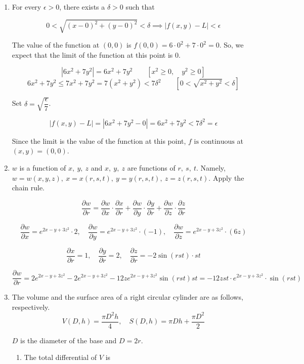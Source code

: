 \documentclass[a4paper, 12pt]{article}
\begin{document}
\begin{enumerate}[leftmargin=*,label=\textbf{\arabic*.}]
\newpage

\item For every $\epsilon>0$, there exists a $\delta>0$ such that

\[0<\sqrt{(x-0)^2+(y-0)^2}<\delta\implies\left|f(x,y)-L\right|<\epsilon\]

The value of the function at $(0,0)$ is $f(0,0)=6\cdot0^2+7\cdot0^2=0$. So, we expect that the limit of the function at this point is $0$.

\[\left|6x^2+7y^2\right|=6x^2+7y^2\qquad\left[x^2\geq0,\quad y^2\geq0\right]\]
\[6x^2+7y^2\leq7x^2+7y^2=7\left(x^2+y^2\right)<7\delta^2\qquad\left[0<\sqrt{x^2+y^2}<\delta\right]\]

Set $\delta=\sqrt{\dfrac\epsilon7}$.

\[\left|f(x,y)-L\right|=|6x^2+7y^2-0|=6x^2+7y^2<7\delta^2=\epsilon\]

Since the limit is the value of the function at this point, $\boxed{f \text{ is continuous}}$ at $(x,y)=(0,0)$.

\item $w$ is a function of $x,\:y,\:z$ and $x,\:y,\:z$ are functions of $r,\:s,\:t$. Namely, $w=w(x,y,z),\:x=x(r,s,t),\:y=y(r,s,t),\:z=z(r,s,t)$. Apply the chain rule.

\[\frac{\partial w}{\partial r}=\frac{\partial w}{\partial x}\cdot\frac{\partial x}{\partial r}+\frac{\partial w}{\partial y}\cdot\frac{\partial y}{\partial r}+\frac{\partial w}{\partial z}\cdot\frac{\partial z}{\partial r}\]

\[\frac{\partial w}{\partial x}={e}^{2x-y+3z^2}\cdot2,\quad\frac{\partial w}{\partial y}={e}^{2x-y+3z^2}\cdot(-1),\quad\frac{\partial w}{\partial z}={e}^{2x-y+3z^2}\cdot(6z)\]

\[\frac{\partial x}{\partial r}=1,\quad\frac{\partial y}{\partial r}=2,\quad\frac{\partial z}{\partial r}=-2\sin(rst)\cdot st\]

\[\frac{\partial w}{\partial r}=2{e}^{2x-y+3z^2}-2{e}^{2x-y+3z^2}-12z{e}^{2x-y+3z^2}\sin(rst)st=\boxed{-12zst\cdot{e}^{2x-y+3z^2}\cdot\sin(rst)}\]

\item The volume and the surface area of a right circular cylinder are as follows, respectively.
\[V(D,h)=\frac{\pi D^2h}4,\quad S(D,h)=\pi Dh+\frac{\pi D^2}2\]

$D$ is the diameter of the base and $D=2r$.

\begin{enumerate}[leftmargin=*,label=\textbf{\alph*.}]
\item The total differential of $V$ is


\end{enumerate}
\end{enumerate}
\end{document}
